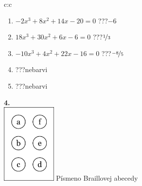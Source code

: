 \documentclass[10pt]{report}
\begin{document}
\begin{tabular}{c:c}
\begin{minipage}[c][104.5mm][t]{0.5\linewidth}
\begin{center}
\begin{minipage}{0.79\linewidth}
\begin{center}
\begin{varwidth}{\linewidth}
\begin{enumerate}
\item $-2x^3+8x^2+14x-20=0$\quad \dotfill\; ???\;\dotfill \quad $-6$
\item $18x^3+30x^2+6x-6=0$\quad \dotfill\; ???\;\dotfill \quad $\nicefrac{1}{3}$
\item $-10x^3+4x^2+22x-16=0$\quad \dotfill\; ???\;\dotfill \quad $\nicefrac{-8}{5}$
\item \quad \dotfill\; ???\;\dotfill \quad nebarvi
\item \quad \dotfill\; ???\;\dotfill \quad nebarvi
\end{enumerate}
\end{varwidth}
\end{center}
\end{minipage}
\begin{minipage}{0.20\linewidth}
\begin{center}
{\Huge\bfseries 4.} \\[2mm]
\includegraphics[height=40mm]{../images/braille.png}
{\small Písmeno Braillovej abecedy}
\end{center}
\end{minipage}
\end{center}
\end{minipage}
%
\end{tabular}
\newpage
\thispagestyle{empty}
\end{document}
